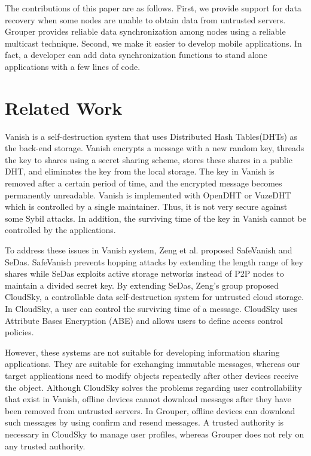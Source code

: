 \documentclass[sigconf]{acmart}
\begin{document}
The contributions of this paper are as follows.
First, we provide support for data recovery when some nodes are unable to obtain data from untrusted servers.
Grouper provides reliable data synchronization among nodes using a reliable multicast technique.
Second, we make it easier to develop mobile applications.
In fact, a developer can add data synchronization functions to stand alone applications with a few lines of code.

\section{Related Work}

Vanish is a self-destruction system\cite{geambasu2009vanish} that uses Distributed Hash Tables(DHTs) as the back-end storage.
Vanish encrypts a message with a new random key, threads the key to shares using a secret sharing scheme, stores these shares in a public DHT, and eliminates the key from the local storage.
The key in Vanish is removed after a certain period of time, and the encrypted message becomes permanently unreadable.
Vanish is implemented with OpenDHT\cite{rhea2005opendht} or VuzeDHT\cite{vuzedht} which is controlled by a single maintainer. 
Thus, it is not very secure against some Sybil attacks\cite{wolchok2010defeating}. 
In addition, the surviving time of the key in Vanish cannot be controlled by the applications. 

To address these issues in Vanish system, Zeng et al. proposed SafeVanish\cite{zeng2010safevanish} and SeDas\cite{zeng2012sedas}. 
SafeVanish prevents hopping attacks by extending the length range of key shares while SeDas exploits active storage networks instead of P2P nodes to maintain a divided secret key. By extending SeDas, Zeng's group proposed CloudSky\cite{zeng2015cloudsky}, a controllable data self-destruction system for untrusted cloud storage. 
In CloudSky, a user can control the surviving time of a message.
CloudSky uses Attribute Bases Encryption (ABE) and allows users to define access control policies.

However, these systems are not suitable for developing information sharing applications. 
They are suitable for exchanging immutable messages, whereas our target applications need to modify objects repeatedly after other devices receive the object. 
Although CloudSky solves the problems regarding user controllability that exist in Vanish, offline devices cannot download messages after they have been removed from untrusted servers.
In Grouper, offline devices can download such messages by using confirm and resend messages.
A trusted authority is necessary in CloudSky to manage user profiles, whereas Grouper does not rely on any trusted authority.
\end{document}
